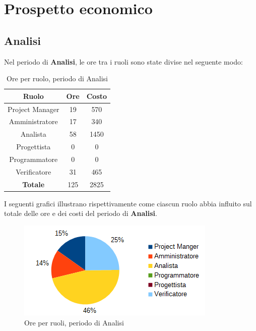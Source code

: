 \section{Prospetto economico}
	\subsection{Analisi}
	Nel periodo di \textbf{Analisi}, le ore tra i ruoli sono state divise nel seguente modo: \\
	\begin{table}[H]
		\centering
		\begin{tabular}{|c|c|c|}
			\hline
			\textbf{Ruolo}		& \textbf{Ore}	& \textbf{Costo} \\
			\hline
			Project Manager		& 19			& 570	\\
			Amministratore		& 17			& 340	\\
			Analista			& 58			& 1450	\\
			Progettista			& 0				& 0	\\
			Programmatore		& 0				& 0	\\
			Verificatore		& 31			& 465	\\
			\hline
			\textbf{Totale}		& 125			& 2825	\\
			\hline
		\end{tabular}
		\caption{Ore per ruolo, periodo di Analisi}
		\end{table}
	I seguenti grafici illustrano rispettivamente come ciascun ruolo abbia influito sul totale
delle ore e dei costi del periodo di \textbf{Analisi}. \\
	\begin{figure}[H]
		\centering
		\includegraphics[width=1\linewidth]{immagini/grafici/analisi-torta.png}
		\caption{Ore per ruoli, periodo di Analisi}
	\end{figure}
